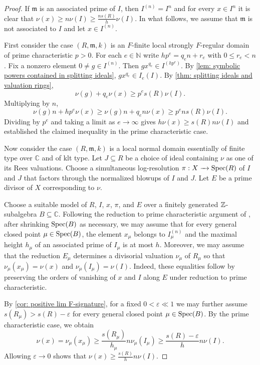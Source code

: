 \documentclass[12pt]{amsart}
\numberwithin{equation}{theorem}
\theoremstyle{plain}
\newcommand{\fm}{\mathfrak{m}}
\newcommand{\CC}{\mathbb{C}}
\newcommand{\NN}{\mathbb{N}}
\begin{document}
\begin{proof}
    If $\fm$ is an associated prime of $I$, then $I^{(n)} = I^n$ and for every $x\in I^{n}$ it is clear that $\nu(x)\geq n\nu(I)\geq \frac{ns(R)}{h}\nu(I)$. In what follows, we assume that $\fm$ is not associated to $I$ and let $x\in I^{(n)}$. 
    
    First consider the case $(R,\fm,k)$ is an $F$-finite local strongly $F$-regular domain of prime characteristic $p>0$. For each $e\in\NN$ write $hp^e = q_en+r_e$ with $0\leq r_e<n$. Fix a nonzero element $0\not = g\in I^{(n)}$. Then $gx^{q_e}\in I^{(hp^e)}$. By \cref{lem: symbolic powers contained in splitting ideals}, $gx^{q_e}\in I_e(I)$. By \cref{thm: splitting ideals and valuation rings},
    \[
    \nu(g) + q_e\nu(x)\geq p^es(R)\nu(I).
    \]
    Multiplying by $n$,
    \[
    \nu(g)n + hp^e\nu(x)\geq \nu(g)n + q_en\nu(x) \geq p^ens(R)\nu(I).
    \]
    Dividing by $p^e$ and taking a limit as $e\to \infty$ gives $h\nu(x)\geq s(R)n\nu(I)$ and established the claimed inequality in the prime characteristic case.


    Now consider the case $(R,\fm,k)$ is a local normal domain essentially of finite type over $\CC$ and of klt type. Let $J\subseteq R$ be a choice of ideal containing $\nu$ as one of its Rees valuations. Choose a simultaneous log-resolution $\pi:X\xrightarrow{\ \ }\operatorname{{Spec}}(R)$ of $I$ and $J$ that factors through the normalized blowups of $I$ and $J$. Let $E$ be a prime divisor of $X$ corresponding to $\nu$.

    Choose a suitable model of $R$, $I$, $x$, $\pi$, and $E$ over a finitely generated $\mbox{$\mathbb{Z}$}$-subalgebra $B\subseteq\CC$. Following the reduction to prime characteristic argument of \cite[proof of Theorem~4.4]{HochsterHuneke2002}, after shrinking $\operatorname{{Spec}}(B)$ as necessary, we may assume that for every general closed point $\mu\in\operatorname{{Spec}}(B)$, the element $x_\mu$ belongs to $I_\mu^{(n)}$ and the maximal height $h_\mu$ of an associated prime of $I_\mu$ is at most $h$. Moreover, we may assume that the reduction $E_\mu$ determines a divisorial valuation $\nu_\mu$ of $R_\mu$ so that $\nu_\mu(x_\mu)=\nu(x)$ and $\nu_\mu(I_\mu)=\nu(I)$. Indeed, these equalities follow by preserving the orders of vanishing of $x$ and $I$ along $E$ under reduction to prime characteristic.

    By \cref{cor: positive lim F-signature}, for a fixed $0<\varepsilon\ll 1$ we may further assume $s(R_\mu)>s(R)-\varepsilon$ for every general closed point $\mu\in\operatorname{{Spec}}(B)$. By the prime characteristic case, we obtain
    \[
        \nu(x)=\nu_\mu(x_\mu)
        \geq \frac{s(R_\mu)}{h_\mu}n\nu_\mu(I_\mu)
        \geq \frac{s(R)-\varepsilon}{h}n\nu(I).
    \]
    Allowing $\varepsilon\to 0$ shows that $\nu(x)\geq\frac{s(R)}{h}n\nu(I)$. 
\end{proof}
\end{document}

